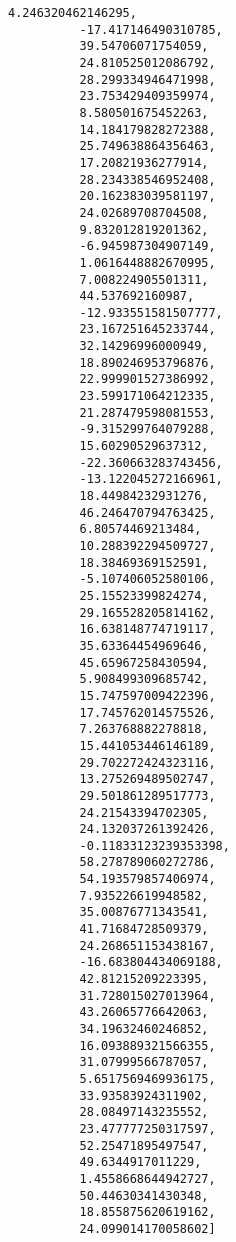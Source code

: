 \documentclass[11pt]{article}
\begin{document}
\begin{Verbatim}[commandchars=\\\{\}]
          4.246320462146295,
          -17.417146490310785,
          39.54706071754059,
          24.810525012086792,
          28.299334946471998,
          23.753429409359974,
          8.580501675452263,
          14.184179828272388,
          25.749638864356463,
          17.20821936277914,
          28.234338546952408,
          20.162383039581197,
          24.02689708704508,
          9.832012819201362,
          -6.945987304907149,
          1.0616448882670995,
          7.008224905501311,
          44.537692160987,
          -12.933551581507777,
          23.167251645233744,
          32.14296996000949,
          18.890246953796876,
          22.999901527386992,
          23.599171064212335,
          21.287479598081553,
          -9.315299764079288,
          15.60290529637312,
          -22.360663283743456,
          -13.122045272166961,
          18.44984232931276,
          46.246470794763425,
          6.80574469213484,
          10.288392294509727,
          18.38469369152591,
          -5.107406052580106,
          25.15523399824274,
          29.165528205814162,
          16.638148774719117,
          35.63364454969646,
          45.65967258430594,
          5.908499309685742,
          15.747597009422396,
          17.745762014575526,
          7.263768882278818,
          15.441053446146189,
          29.702272424323116,
          13.275269489502747,
          29.501861289517773,
          24.21543394702305,
          24.132037261392426,
          -0.11833123239353398,
          58.278789060272786,
          54.193579857406974,
          7.935226619948582,
          35.00876771343541,
          41.71684728509379,
          24.268651153438167,
          -16.683804434069188,
          42.81215209223395,
          31.728015027013964,
          43.26065776642063,
          34.19632460246852,
          16.093889321566355,
          31.07999566787057,
          5.6517569469936175,
          33.93583924311902,
          28.08497143235552,
          23.477777250317597,
          52.25471895497547,
          49.6344917011229,
          1.4558668644942727,
          50.44630341430348,
          18.855875620619162,
          24.099014170058602]
\end{Verbatim}
            
    \begin{center}
    \end{center}
    { \hspace*{\fill} \\}
    
\end{document}
